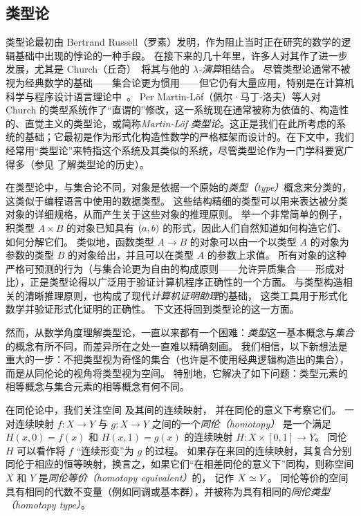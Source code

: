 \subsection*{类型论}

类型论最初由 Bertrand Russell（罗素）\cite{Russell:1908}发明，作为阻止当时正在研究的数学的逻辑基础中出现的悖论的一种手段。
在接下来的几十年里，许多人对其作了进一步发展，尤其是 Church（丘奇）~\cite{Church:1940tu,Church:1941tc}将其与他的 \textit{$\lambda$-演算}相结合。
尽管类型论通常不被视为经典数学的基础——集合论更为惯用——但它仍有大量应用，特别是在计算机科学与程序设计语言理论中~\cite{Pierce-TAPL}。
%
%
%
Per Martin-L\"of（佩尔·马丁-洛夫）\cite{Martin-Lof-1972,Martin-Lof-1973,Martin-Lof-1979,martin-lof:bibliopolis}等人对 Church 的类型系统作了“直谓的”修改，这一系统现在通常被称为依值的、构造性的、直觉主义的类型论，或简称\emph{Martin-L\"of 类型论}。这正是我们在此所考虑的系统的基础；它最初是作为形式化构造性数学的严格框架而设计的。在下文中，我们经常用“类型论”来特指这个系统及其类似的系统，尽管类型论作为一门学科要宽广得多（参见 \cite{somma,kamar} 了解类型论的历史）。

在类型论中，与集合论不同，对象是依据一个原始的\emph{类型（type）}概念来分类的，这类似于编程语言中使用的数据类型。
这些结构精细的类型可以用来表达被分类对象的详细规格，从而产生关于这些对象的推理原则。
举一个非常简单的例子，积类型 $A\times B$ 的对象已知具有 ${\mathopen{}(a,b)\mathclose{}}$ 的形式，因此人们自然知道如何构造它们、如何分解它们。
类似地，函数类型 $A\to B$ 的对象可以由一个以类型 $A$ 的对象为参数的类型 $B$ 的对象给出，并且可以在类型 $A$ 的参数上求值。
所有对象的这种严格可预测的行为（与集合论更为自由的构成原则——允许异质集合——形成对比），正是类型论得以广泛用于验证计算机程序正确性的一个方面。
与类型构造相关的清晰推理原则，也构成了现代\emph{计算机证明助理}的基础，%
%
%
这类工具用于形式化数学并验证形式化证明的正确性。
下文还将回到类型论的这一方面。

然而，从数学角度理解类型论，一直以来都有一个困难：\emph{类型}这一基本概念与\emph{集合}的概念有所不同，而差异所在之处一直难以精确刻画。
我们相信，以下新想法是重大的一步：不把类型视为奇怪的集合（也许是不使用经典逻辑构造出的集合），而是从同伦论的视角将类型视为空间。
特别地，它解决了如下问题：类型元素的相等概念与集合元素的相等概念有何不同。

在同伦论中，我们关注空间
%
及其间的连续映射，
%
并在同伦的意义下考察它们。
一对连续映射 $f : X \to Y$ 与 $g : X\to Y$ 之间的一个\emph{同伦（homotopy）}
%
是一个满足 $H(x, 0) = f (x)$ 和 $H(x, 1) = g(x)$ 的连续映射 $H : X \times [0, 1] \to Y$。
同伦 $H$ 可以看作将 $f$ “连续形变”为 $g$ 的过程。
如果存在来回的连续映射，其复合分别同伦于相应的恒等映射，换言之，如果它们“在相差同伦的意义下”同构，则称空间 $X$ 和 $Y$ 是\emph{同伦等价（homotopy equivalent）}的，
%
记作 $X \simeq Y$。
同伦等价的空间具有相同的代数不变量（例如同调或基本群），并被称为具有相同的\emph{同伦类型（homotopy type）}。

